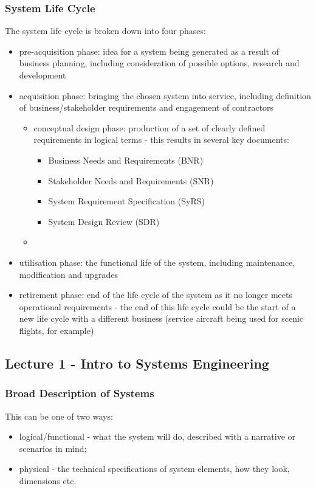 \documentclass[journal]{IEEEtran}
\begin{document}
\subsubsection{System Life Cycle}
The system life cycle is broken down into four phases:
\begin{itemize}
	\item pre-acquisition phase: idea for a system being generated as a result of business planning, including consideration of possible options, research and development
	\item acquisition phase: bringing the chosen system into service, including definition of business/stakeholder requirements and engagement of contractors
	\begin{itemize}
		\item conceptual design phase: production of a set of clearly defined requirements in logical terms - this results in several key documents:
		\begin{itemize}
			\item Business Needs and Requirements (BNR)
			\item Stakeholder Needs and Requirements (SNR)
			\item System Requirement Specification (SyRS)
			\item System Design Review (SDR)	
		\end{itemize}
		\item 
	\end{itemize}
	\item utilisation phase: the functional life of the system, including maintenance, modification and upgrades
	\item retirement phase: end of the life cycle of the system as it no longer meets operational requirements - the end of this life cycle could be the start of a new life cycle with a different business (service aircraft being used for scenic flights, for example)
\end{itemize}
\subsection{\textbf{Lecture 1 - Intro to Systems Engineering}}
\subsubsection{Broad Description of Systems}
This can be one of two ways:
	\begin{itemize}
		\item logical/functional - what the system will do, described with a narrative or scenarios in mind;
		\item physical - the technical specifications of system elements, how they look, dimensions etc.
	\end{itemize}
\end{document}
